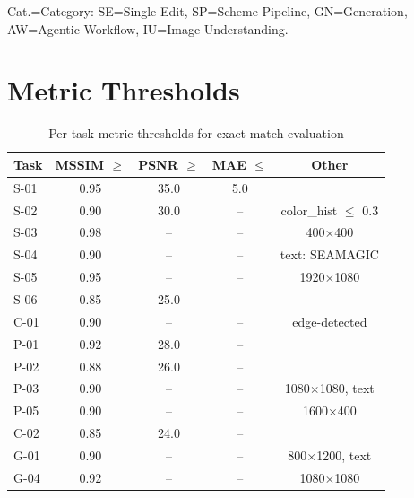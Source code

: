 \documentclass[11pt,a4paper]{article}
\begin{document}
Cat.=Category: SE=Single Edit, SP=Scheme Pipeline, GN=Generation, AW=Agentic Workflow, IU=Image Understanding.

\section{Metric Thresholds}

\begin{table}[h]
\centering
\caption{Per-task metric thresholds for exact match evaluation}
\label{tab:thresholds}
\small
\begin{tabular}{lcccc}
\toprule
\textbf{Task} & \textbf{MSSIM $\geq$} & \textbf{PSNR $\geq$} & \textbf{MAE $\leq$} & \textbf{Other} \\
\midrule
S-01 & 0.95 & 35.0 & 5.0 & \\
S-02 & 0.90 & 30.0 & -- & color\_hist $\leq$ 0.3 \\
S-03 & 0.98 & -- & -- & 400$\times$400 \\
S-04 & 0.90 & -- & -- & text: SEAMAGIC \\
S-05 & 0.95 & -- & -- & 1920$\times$1080 \\
S-06 & 0.85 & 25.0 & -- & \\
C-01 & 0.90 & -- & -- & edge-detected \\
P-01 & 0.92 & 28.0 & -- & \\
P-02 & 0.88 & 26.0 & -- & \\
P-03 & 0.90 & -- & -- & 1080$\times$1080, text \\
P-05 & 0.90 & -- & -- & 1600$\times$400 \\
C-02 & 0.85 & 24.0 & -- & \\
G-01 & 0.90 & -- & -- & 800$\times$1200, text \\
G-04 & 0.92 & -- & -- & 1080$\times$1080 \\
\bottomrule
\end{tabular}
\end{table}
\end{document}
